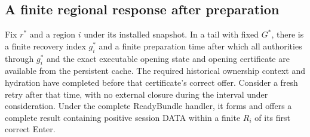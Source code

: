 \subsection{A finite regional response after preparation}
\label{sec:v35-regional-response}
\begin{proposition}
\label{prop:v35-regional-response}
Fix $r^*$ and a region $i$ under its installed snapshot. In a tail with
fixed $G^*$, there is a finite recovery index $g_i^*$ and a finite
preparation time after which all authorities through $g_i^*$ and the
exact executable opening state and opening certificate are available
from the persistent cache. The required historical ownership context
and hydration have completed before that certificate's correct offer.
Consider a fresh retry after that time, with no external closure during the
interval under consideration. Under the complete ReadyBundle handler,
it forms and offers a complete result containing positive session DATA
within a finite $R_i$ of its first correct Enter.
\end{proposition}
